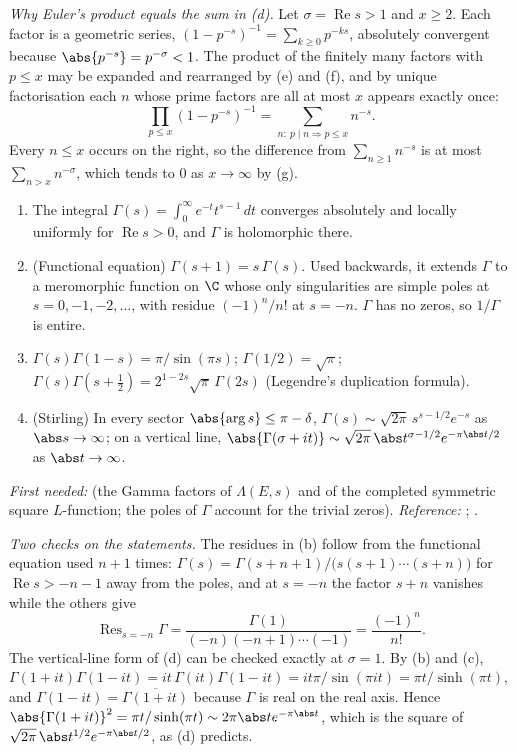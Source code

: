 \emph{Why Euler's product equals the sum in (d).} Let $\sigma=\operatorname{Re}s>1$ and $x\ge2$. Each
factor is a geometric series, $(1-p^{-s})^{-1}=\sum_{k\ge0}p^{-ks}$, absolutely convergent because
$\abs{p^{-s}}=p^{-\sigma}<1$. The product of the finitely many factors with $p\le x$ may be expanded
and rearranged by (e) and (f), and by unique factorisation each $n$ whose
prime factors are all at most $x$ appears exactly once:
\[
\prod_{p\le x}(1-p^{-s})^{-1}=\sum_{n:\ p\mid n\Rightarrow p\le x}n^{-s}.
\]
Every $n\le x$ occurs on the right, so the difference from $\sum_{n\ge1}n^{-s}$ is at most
$\sum_{n>x}n^{-\sigma}$, which tends to $0$ as $x\to\infty$ by (g).

\begin{theorem}\label{thm:prereq:gamma}
\leavevmode
\begin{enumerate}[label=(\alph*)]
\item The integral $\Gamma(s)=\int_0^\infty e^{-t}t^{s-1}\,dt$ converges absolutely and locally
uniformly for $\operatorname{Re}s>0$, and $\Gamma$ is holomorphic there.
\item (Functional equation) $\Gamma(s+1)=s\,\Gamma(s)$. Used backwards, it extends $\Gamma$ to a
meromorphic function on $\C$ whose only singularities are simple poles at $s=0,-1,-2,\dots$, with
residue $(-1)^n/n!$ at $s=-n$. $\Gamma$ has no zeros, so $1/\Gamma$ is entire.
\item $\Gamma(s)\Gamma(1-s)=\pi/\sin(\pi s)$; $\Gamma(1/2)=\sqrt\pi$;
$\Gamma(s)\Gamma(s+\tfrac12)=2^{1-2s}\sqrt\pi\,\Gamma(2s)$ (Legendre's duplication formula).
\item (Stirling) In every sector $\abs{\arg s}\le\pi-\delta$,
$\Gamma(s)\sim\sqrt{2\pi}\,s^{s-1/2}e^{-s}$ as $\abs s\to\infty$; on a vertical line,
$\abs{\Gamma(\sigma+it)}\sim\sqrt{2\pi}\,\abs t^{\sigma-1/2}e^{-\pi\abs t/2}$ as $\abs t\to\infty$.
\end{enumerate}
\end{theorem}
\noindent\emph{First needed:}  (the Gamma factors of $\Lambda(E,s)$ and of the
completed symmetric square $L$-function; the poles of $\Gamma$ account for the trivial zeros).
\emph{Reference:} \cite[Chapter 5, Section 2]{Ahlfors79}; \cite[Chapter 6]{SteinShakarchi03}.

\emph{Two checks on the statements.} The residues in (b) follow from the functional equation used
$n+1$ times: $\Gamma(s)=\Gamma(s+n+1)/\bigl(s(s+1)\cdots(s+n)\bigr)$ for $\operatorname{Re}s>-n-1$
away from the poles, and at $s=-n$ the factor $s+n$ vanishes while the others give
\[
\operatorname{Res}_{s=-n}\Gamma=\frac{\Gamma(1)}{(-n)(-n+1)\cdots(-1)}=\frac{(-1)^n}{n!}.
\]
The vertical-line form of (d) can be checked exactly at $\sigma=1$. By (b) and (c),
$\Gamma(1+it)\Gamma(1-it)=it\,\Gamma(it)\Gamma(1-it)=it\pi/\sin(\pi it)=\pi t/\sinh(\pi t)$, and
$\Gamma(1-it)=\overline{\Gamma(1+it)}$ because $\Gamma$ is real on the real axis. Hence
$\abs{\Gamma(1+it)}^2=\pi t/\sinh(\pi t)\sim2\pi\abs te^{-\pi\abs t}$, which is the square of
$\sqrt{2\pi}\,\abs t^{1/2}e^{-\pi\abs t/2}$, as (d) predicts.

